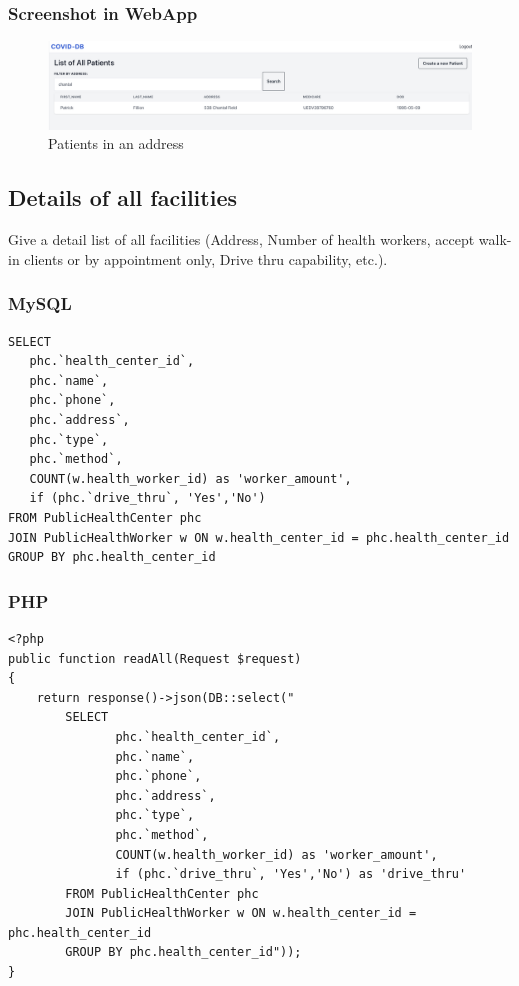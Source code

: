 \documentclass{article}
\begin{document}
\subsubsection{Screenshot in WebApp}   

\begin{figure}[H]
    \centering
    \includegraphics[scale=0.25]{imgs/patientsbyadr.png}
    \caption{Patients in an address}
\end{figure}



\subsection{Details of all facilities}
Give a detail list of all facilities (Address, Number of health workers, accept
walk-in clients or by appointment only, Drive thru capability, etc.).

\subsubsection{MySQL}
\begin{verbatim}
SELECT
   phc.`health_center_id`,
   phc.`name`,
   phc.`phone`,
   phc.`address`,
   phc.`type`,
   phc.`method`,
   COUNT(w.health_worker_id) as 'worker_amount',
   if (phc.`drive_thru`, 'Yes','No')
FROM PublicHealthCenter phc
JOIN PublicHealthWorker w ON w.health_center_id = phc.health_center_id
GROUP BY phc.health_center_id

\end{verbatim}

\subsubsection{PHP}
\begin{verbatim}
<?php
public function readAll(Request $request)
{
    return response()->json(DB::select("
        SELECT
               phc.`health_center_id`,
               phc.`name`,
               phc.`phone`,
               phc.`address`,
               phc.`type`,
               phc.`method`,
               COUNT(w.health_worker_id) as 'worker_amount',
               if (phc.`drive_thru`, 'Yes','No') as 'drive_thru'
        FROM PublicHealthCenter phc
        JOIN PublicHealthWorker w ON w.health_center_id = phc.health_center_id
        GROUP BY phc.health_center_id"));
}

\end{verbatim}
\end{document}
